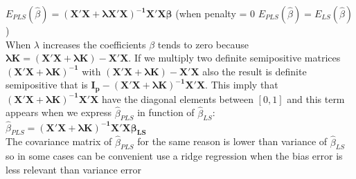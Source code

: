 \documentclass[10pt,a4paper]{article}
\begin{document}
\begin{enumerate}
			$   E_{PLS}(\hat{\beta}) = \mathbf{(X'X + \lambda X'X)^{-1} X'X \beta} $   (when penalty = 0 $  E_{PLS}(\hat{\beta}) = E_{LS}(\hat{\beta})   $)\\
			When $ \lambda $ increases the coefficients $\beta $ tends to zero because $ \mathbf{\lambda K = (X'X + \lambda K)- X'X} $. If we multiply two definite semipositive matrices $ \mathbf{(X'X + \lambda K)^{-1}} $ with $  \mathbf{(X'X + \lambda K)- X'X}  $ also the result is definite semipositive  that is $ \mathbf{I_p - (X'X + \lambda K)^{-1}X'X}  $. This imply that $ \mathbf{(X'X + \lambda K)^{-1}X'X}    $ have the diagonal elements between $[0,1] $ and this term appears when we express $ \hat{\beta}_{PLS} $ in function of $ \hat{\beta}_{LS} $:\\
			$ \hat{\beta}_{PLS} =  \mathbf{(X'X + \lambda K)^{-1}X'X \beta_{LS}}   $\\
			The covariance matrix of $ \hat{\beta}_{PLS} $ for the same reason is lower than variance of $ \hat{\beta}_{LS} $ so in some cases can be convenient use a ridge regression when the bias error is less relevant than variance error 
	\end{enumerate}
\end{document}
